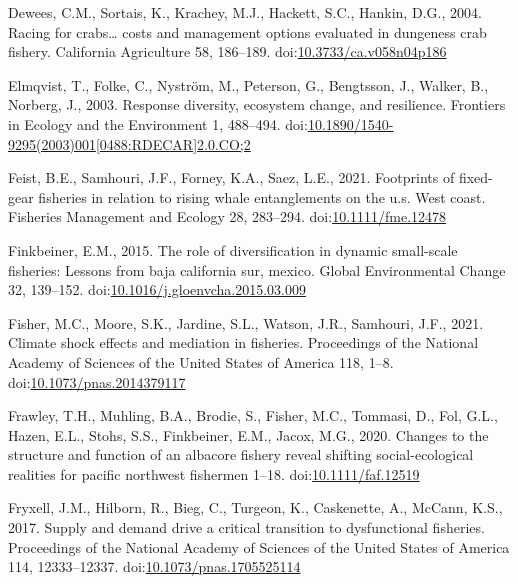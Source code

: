\documentclass[]{elsarticle} %
\begin{document}
\leavevmode\hypertarget{ref-Dewees2004}{}%
Dewees, C.M., Sortais, K., Krachey, M.J., Hackett, S.C., Hankin, D.G.,
2004. Racing for crabs\ldots{} costs and management options evaluated in
dungeness crab fishery. California Agriculture 58, 186--189.
doi:\href{https://doi.org/10.3733/ca.v058n04p186}{10.3733/ca.v058n04p186}

\leavevmode\hypertarget{ref-Elmqvist2003a}{}%
Elmqvist, T., Folke, C., Nyström, M., Peterson, G., Bengtsson, J.,
Walker, B., Norberg, J., 2003. Response diversity, ecosystem change, and
resilience. Frontiers in Ecology and the Environment 1, 488--494.
doi:\href{https://doi.org/10.1890/1540-9295(2003)001\%5B0488:RDECAR\%5D2.0.CO;2}{10.1890/1540-9295(2003)001{[}0488:RDECAR{]}2.0.CO;2}

\leavevmode\hypertarget{ref-Feist2021}{}%
Feist, B.E., Samhouri, J.F., Forney, K.A., Saez, L.E., 2021. Footprints
of fixed-gear fisheries in relation to rising whale entanglements on the
u.s. West coast. Fisheries Management and Ecology 28, 283--294.
doi:\href{https://doi.org/10.1111/fme.12478}{10.1111/fme.12478}

\leavevmode\hypertarget{ref-Finkbeiner2015}{}%
Finkbeiner, E.M., 2015. The role of diversification in dynamic
small-scale fisheries: Lessons from baja california sur, mexico. Global
Environmental Change 32, 139--152.
doi:\href{https://doi.org/10.1016/j.gloenvcha.2015.03.009}{10.1016/j.gloenvcha.2015.03.009}

\leavevmode\hypertarget{ref-Fisher2021}{}%
Fisher, M.C., Moore, S.K., Jardine, S.L., Watson, J.R., Samhouri, J.F.,
2021. Climate shock effects and mediation in fisheries. Proceedings of
the National Academy of Sciences of the United States of America 118,
1--8.
doi:\href{https://doi.org/10.1073/pnas.2014379117}{10.1073/pnas.2014379117}

\leavevmode\hypertarget{ref-Frawley2020}{}%
Frawley, T.H., Muhling, B.A., Brodie, S., Fisher, M.C., Tommasi, D.,
Fol, G.L., Hazen, E.L., Stohs, S.S., Finkbeiner, E.M., Jacox, M.G.,
2020. Changes to the structure and function of an albacore fishery
reveal shifting social-ecological realities for pacific northwest
fishermen 1--18.
doi:\href{https://doi.org/10.1111/faf.12519}{10.1111/faf.12519}

\leavevmode\hypertarget{ref-Fryxell2017}{}%
Fryxell, J.M., Hilborn, R., Bieg, C., Turgeon, K., Caskenette, A.,
McCann, K.S., 2017. Supply and demand drive a critical transition to
dysfunctional fisheries. Proceedings of the National Academy of Sciences
of the United States of America 114, 12333--12337.
doi:\href{https://doi.org/10.1073/pnas.1705525114}{10.1073/pnas.1705525114}
\end{document}
